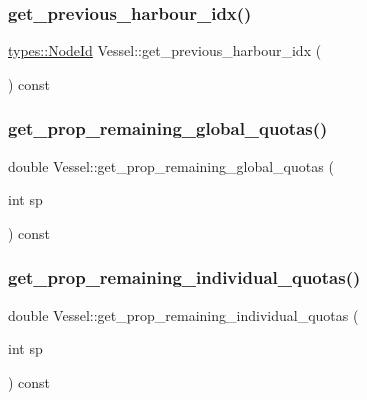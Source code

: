 \subsubsection{\texorpdfstring{get\_previous\_harbour\_idx()}{get\_previous\_harbour\_idx()}}
{\footnotesize\ttfamily \mbox{\hyperlink{classtypes_1_1_node_id}{types\+::\+Node\+Id}} Vessel\+::get\+\_\+previous\+\_\+harbour\+\_\+idx (\begin{DoxyParamCaption}{ }\end{DoxyParamCaption}) const}

\mbox{\label{class_vessel_ad6171400af65065dfe3ebec67039307e}} 
\subsubsection{\texorpdfstring{get\_prop\_remaining\_global\_quotas()}{get\_prop\_remaining\_global\_quotas()}}
{\footnotesize\ttfamily double Vessel\+::get\+\_\+prop\+\_\+remaining\+\_\+global\+\_\+quotas (\begin{DoxyParamCaption}\item[{int}]{sp }\end{DoxyParamCaption}) const}

\mbox{\label{class_vessel_a956ada878183121d869c5db148aed8ac}} 
\subsubsection{\texorpdfstring{get\_prop\_remaining\_individual\_quotas()}{get\_prop\_remaining\_individual\_quotas()}}
{\footnotesize\ttfamily double Vessel\+::get\+\_\+prop\+\_\+remaining\+\_\+individual\+\_\+quotas (\begin{DoxyParamCaption}\item[{int}]{sp }\end{DoxyParamCaption}) const}

\mbox{\label{class_vessel_ae6dfc75558f82868dc043e5b06051d2b}} 
